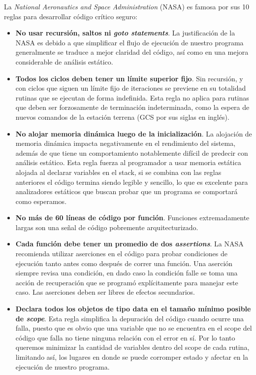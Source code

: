   La \textit{National Aeronautics and Space Administration} (NASA) es famosa por sus 10 reglas para desarrollar código crítico seguro:
	\begin{itemize}
\item{\textbf{No usar recursión, saltos ni \textit{goto statements}}. La justificación de la NASA es debido a que simplificar el flujo de ejecución de nuestro programa generalmente se traduce a mejor claridad del código, así como en una mejora considerable de análisis estático.}
  \item {\textbf{Todos los ciclos deben tener un límite superior fijo}. Sin recursión, y con ciclos que siguen un límite fijo de iteraciones se previene en su totalidad rutinas que se ejecutan de forma indefinida. Esta regla no aplica para rutinas que deben ser forzosamente de terminación indeterminada, como la espera de nuevos comandos de la estación terrena (GCS por sus siglas en inglés).}
  \item {\textbf{No alojar memoria dinámica luego de la inicialización}. La alojación de memoria dinámica impacta negativamente en el rendimiento del sistema, además de que tiene un comportamiento notablemente difícil de predecir con análisis estático. Esta regla fuerza al programador a usar memoria estática alojada al declarar variables en el stack, si se combina con las reglas anteriores el código termina siendo legible y sencillo, lo que es excelente para analizadores estáticos que buscan probar que un programa se comportará como esperamos.}
  \item {\textbf{No más de 60 líneas de código por función}. Funciones extremadamente largas son una señal de código pobremente arquitecturizado.}
  \item {\textbf{Cada función debe tener un promedio de dos \textit{assertions}}. La NASA recomienda utilizar aserciones en el código para probar condiciones de ejecución tanto antes como después de correr una función. Una aserción siempre revisa una condición, en dado caso la condición falle se toma una acción de recuperación que se programó explícitamente para manejar este caso. Las aserciones deben ser libres de efectos secundarios.}
  \item {\textbf{Declara todos los objetos de tipo data en el tamaño mínimo posible de \textit{scope}}. Esta regla simplifica la depuración del código cuando ocurre una falla, puesto que es obvio que una variable que no se encuentra en el scope del código que falla no tiene ninguna relación con el error en sí. Por lo tanto queremos minimizar la cantidad de variables dentro del scope de cada rutina, limitando así, los lugares en donde se puede corromper estado y afectar en la ejecución de nuestro programa.}

\end{itemize}
